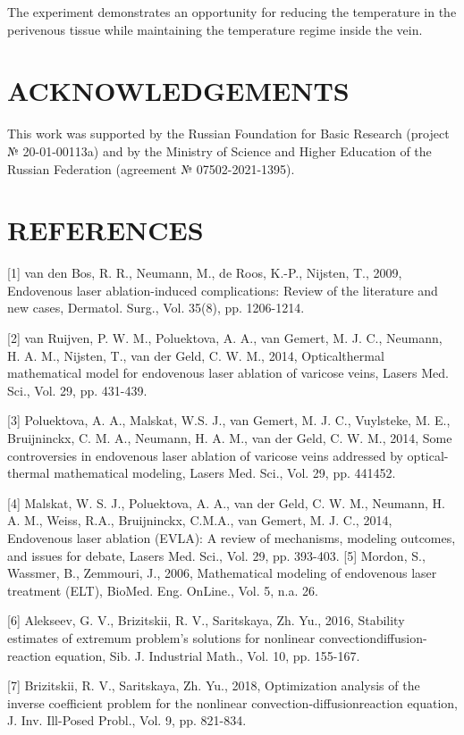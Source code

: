 \documentclass[10pt]{article}
\begin{document}
The experiment demonstrates an opportunity for reducing the temperature in the perivenous tissue while maintaining the temperature regime inside the vein.

\section{ACKNOWLEDGEMENTS}
This work was supported by the Russian Foundation for Basic Research (project № 20-01-00113a) and by the Ministry of Science and Higher Education of the Russian Federation (agreement № 07502-2021-1395).

\section{REFERENCES}
[1] van den Bos, R. R., Neumann, M., de Roos, K.-P., Nijsten, T., 2009, Endovenous laser ablation-induced complications: Review of the literature and new cases, Dermatol. Surg., Vol. 35(8), pp. 1206-1214.

[2] van Ruijven, P. W. M., Poluektova, A. A., van Gemert, M. J. C., Neumann, H. A. M., Nijsten, T., van der Geld, C. W. M., 2014, Opticalthermal mathematical model for endovenous laser ablation of varicose veins, Lasers Med. Sci., Vol. 29, pp. 431-439.

[3] Poluektova, A. A., Malskat, W.S. J., van Gemert, M. J. C., Vuylsteke, M. E., Bruijninckx, C. M. A., Neumann, H. A. M., van der Geld, C. W. M., 2014, Some controversies in endovenous laser ablation of varicose veins addressed by optical-thermal mathematical modeling, Lasers Med. Sci., Vol. 29, pp. 441452.

[4] Malskat, W. S. J., Poluektova, A. A., van der Geld, C. W. M., Neumann, H. A. M., Weiss, R.A., Bruijninckx, C.M.A., van Gemert, M. J. C., 2014, Endovenous laser ablation (EVLA): A review of mechanisms, modeling outcomes, and issues for debate, Lasers Med. Sci., Vol. 29, pp. 393-403. [5] Mordon, S., Wassmer, B., Zemmouri, J., 2006, Mathematical modeling of endovenous laser treatment (ELT), BioMed. Eng. OnLine., Vol. 5, n.a. 26.

[6] Alekseev, G. V., Brizitskii, R. V., Saritskaya, Zh. Yu., 2016, Stability estimates of extremum problem's solutions for nonlinear convectiondiffusion-reaction equation, Sib. J. Industrial Math., Vol. 10, pp. 155-167.

[7] Brizitskii, R. V., Saritskaya, Zh. Yu., 2018, Optimization analysis of the inverse coefficient problem for the nonlinear convection-diffusionreaction equation, J. Inv. Ill-Posed Probl., Vol. 9, pp. 821-834.
\end{document}
